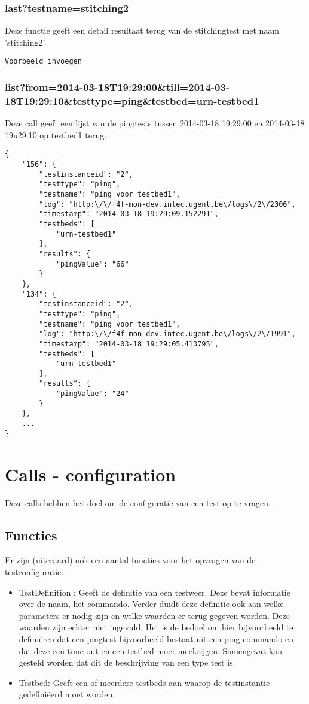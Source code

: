 \subsubsection{last?testname=stitching2}
Deze functie geeft een detail resultaat terug van de stitchingtest met naam 'stitching2'.
\begin{verbatim}
Voorbeeld invoegen
\end{verbatim}

\subsubsection{list?from=2014-03-18T19:29:00\&till=2014-03-18T19:29:10\&testtype=ping\&testbed=urn-testbed1}
Deze call geeft een lijst van de pingtests tussen 2014-03-18 19:29:00 en 2014-03-18 19u29:10 op testbed1 terug.
\begin{verbatim}
{
    "156": {
        "testinstanceid": "2",
        "testtype": "ping",
        "testname": "ping voor testbed1",
        "log": "http:\/\/f4f-mon-dev.intec.ugent.be\/logs\/2\/2306",
        "timestamp": "2014-03-18 19:29:09.152291",
        "testbeds": [
            "urn-testbed1"
        ],
        "results": {
            "pingValue": "66"
        }
    },
    "134": {
        "testinstanceid": "2",
        "testtype": "ping",
        "testname": "ping voor testbed1",
        "log": "http:\/\/f4f-mon-dev.intec.ugent.be\/logs\/2\/1991",
        "timestamp": "2014-03-18 19:29:05.413795",
        "testbeds": [
            "urn-testbed1"
        ],
        "results": {
            "pingValue": "24"
        }
    },
    ...
}
\end{verbatim}

\section{Calls - configuration}
Deze calls hebben het doel om de configuratie van een test op te vragen.

\subsection{Functies}
Er zijn (uiteraard) ook een aantal functies voor het opvragen van de testconfiguratie.
\begin{itemize}
\item TestDefinition : Geeft de definitie van een testweer. Deze bevat informatie over de naam, het commando. Verder duidt deze definitie ook aan welke parameters er nodig zijn en welke waarden er terug gegeven worden. Deze waarden zijn echter niet ingevuld. Het is de bedoel om hier bijvoorbeeld te defini\"eren dat een pingtest bijvoorbeeld bestaat uit een ping commando en dat deze een time-out en een testbed moet meekrijgen. Samengevat kan gesteld worden dat dit de beschrijving van een type test is.
\item Testbed: Geeft een of meerdere testbeds aan waarop de testinstantie gedefini\"eerd moet worden.
\end{itemize}

